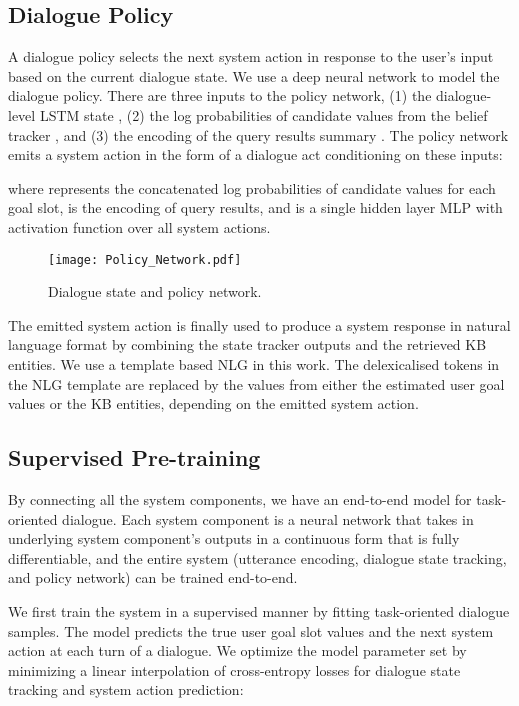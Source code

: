 \documentclass[11pt,a4paper]{article}
\begin{document}
\subsection{Dialogue Policy}
    A dialogue policy selects the next system action in response to the user's input based on the current dialogue state. We use a deep neural network to model the dialogue policy. There are three inputs to the policy network, (1) the dialogue-level LSTM state , (2) the log probabilities of candidate values from the belief tracker , and (3) the encoding of the query results summary . The policy network emits a system action in the form of a dialogue act conditioning on these inputs:
    
    where  represents the concatenated log probabilities of candidate values for each goal slot,  is the encoding of query results, and  is a single hidden layer MLP with  activation function over all system actions.
    \begin{figure}[t]
        \centering
        \texttt{[image: Policy\_Network.pdf]}
        \caption{{ Dialogue state and policy network. }}
        \label{fig:policy_network}
    \end{figure}

    The emitted system action is finally used to produce a system response in natural language format by combining the state tracker outputs and the retrieved KB entities. We use a template based NLG in this work. The delexicalised tokens in the NLG template are replaced by the values from either the estimated user goal values or the KB entities, depending on the emitted system action. 

\subsection{Supervised Pre-training}
    By connecting all the system components, we have an end-to-end model for task-oriented dialogue. Each system component is a neural network that takes in underlying system component's outputs in a continuous form that is fully differentiable, and the entire system (utterance encoding, dialogue state tracking, and policy network) can be trained end-to-end. 
    
    We first train the system in a supervised manner by fitting task-oriented dialogue samples. The model predicts the true user goal slot values and the next system action at each turn of a dialogue. We optimize the model parameter set  by minimizing a linear interpolation of cross-entropy losses for dialogue state tracking and system action prediction:
        
\end{document}
